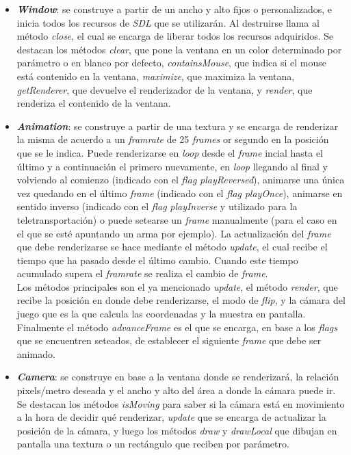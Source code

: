 \begin{itemize}
	\item \textbf{\textit{Window}}: se construye a partir de un ancho y alto fijos o personalizados, e inicia todos los recursos de \textit{SDL} que se utilizarán. Al destruirse llama al método \textit{close}, el cual se encarga de liberar todos los recursos adquiridos. Se destacan los métodos \textit{clear}, que pone la ventana en un color determinado por parámetro o en blanco por defecto, \textit{containsMouse}, que indica si el mouse está contenido en la ventana, \textit{maximize}, que maximiza la ventana, \textit{getRenderer}, que devuelve el renderizador de la ventana, y \textit{render}, que renderiza el contenido de la ventana.
	
	\item \textbf{\textit{Animation}}: se construye a partir de una textura y se encarga de renderizar la misma de acuerdo a un \textit{framrate} de 25 \textit{frames} or segundo en la posición que se le indica. Puede renderizarse en \textit{loop} desde el \textit{frame} incial hasta el último y a continuación el primero nuevamente, en \textit{loop} llegando al final y volviendo al comienzo (indicado con el \textit{flag} \textit{playReversed}), animarse una única vez quedando en el último \textit{frame} (indicado con el \textit{flag} \textit{playOnce}), animarse en sentido inverso (indicado con el \textit{flag} \textit{playInverse} y utilizado para la teletransportación) o puede setearse un \textit{frame} manualmente (para el caso en el que se esté apuntando un arma por ejemplo). La actualización del \textit{frame} que debe renderizarse se hace mediante el método \textit{update}, el cual recibe el tiempo que ha pasado desde el último cambio. Cuando este tiempo acumulado supera el \textit{framrate} se realiza el cambio de \textit{frame}.\\
	\indent Los métodos principales son el ya mencionado \textit{update}, el método \textit{render}, que recibe la posición en donde debe renderizarse, el modo de \textit{flip}, y la cámara del juego que es la que calcula las coordenadas y la muestra en pantalla. Finalmente el método \textit{advanceFrame} es el que se encarga, en base a los \textit{flags} que se encuentren seteados, de establecer el siguiente \textit{frame} que debe ser animado.
	
	\item \textbf{\textit{Camera}}: se construye en base a la ventana donde se renderizará, la relación pixels/metro deseada  y el ancho y alto del área a donde la cámara puede ir. Se destacan los métodos \textit{isMoving} para saber si la cámara está en movimiento a la hora de decidir qué renderizar, \textit{update} que se encarga de actualizar la posición de la cámara, y luego los métodos \textit{draw} y \textit{drawLocal} que dibujan en pantalla una textura o un rectángulo que reciben por parámetro.
	

\end{itemize}
